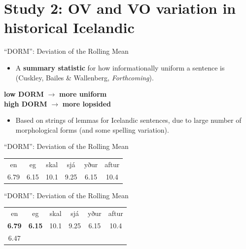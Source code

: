 \documentclass[hyperref={pdfpagelabels=false}]{beamer}
\begin{document}
\section{Study 2: OV and VO variation in historical Icelandic}


\begin{frame}{``DORM'': Deviation of the Rolling Mean} 

\begin{itemize}
	\item A \textbf{summary statistic} for how informationally uniform a sentence is (Cuskley, Bailes \& Wallenberg, \textsl{Forthcoming}).
\end{itemize}
	\begin{center}
		 \textbf{low DORM} $\rightarrow$ \textbf{more uniform}\\
		 \textbf{high DORM} $\rightarrow$ \textbf{more lopsided}
	\end{center}
\begin{itemize}

	\item Based on strings of lemmas for Icelandic sentences, due to large number of morphological forms (and some spelling variation). 
\end{itemize}

\end{frame}

\begin{frame}{``DORM'': Deviation of the Rolling Mean} 

	\begin{center}
\begin{tabular}{c c c c c c}
			en & eg & skal & sjá & yður & aftur \\
			6.79 & 6.15 & 10.1 & 9.25 & 6.15 & 10.4\\
	\end{tabular}
\end{center}
\end{frame}

\begin{frame}{``DORM'': Deviation of the Rolling Mean} 
	
	\begin{center}
	\begin{tabular}{c c c c c c}
		en & eg & skal & sjá & yður & aftur \\
		\textbf{6.79} & \textbf{6.15} & 10.1 & 9.25 & 6.15 & 10.4\\
		6.47 & & & & & 
	\end{tabular}
	\end{center}
	
\end{frame}
\end{document}
